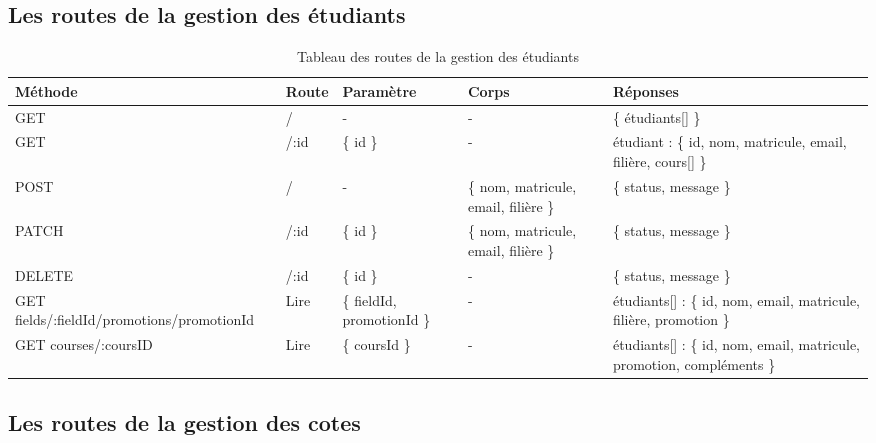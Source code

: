 \subsection{Les routes de la gestion des étudiants}\label{subsec:routes-student}

\begin{table}[ht]
  \caption{Tableau des routes de la gestion des étudiants}
  \label{tab:routes-student}
  \begin{tabular}{|p{1.5cm}|p{1cm}|p{2cm}|p{3cm}|p{3cm}| }
    \hline
    Méthode & Route & Paramètre & Corps & Réponses \\
    \hline
    GET & / & - & - & \{ étudiants[] \} \\
    \hline
    GET & /:id & \{ id \} & - & étudiant : \{ id, nom, matricule, email, filière, cours[] \} \\
    \hline
    POST & / & - & \{ nom, matricule, email, filière \} & \{ status, message \} \\
    \hline
    PATCH & /:id & \{ id \} & \{ nom, matricule, email, filière \} & \{ status, message \} \\
    \hline
    DELETE & /:id & \{ id \} & - & \{ status, message \} \\
    \hline
    GET fields/:fieldId/promotions/promotionId & Lire & \{ fieldId, promotionId \} & - &  étudiants[] : \{ id, nom, email, matricule, filière, promotion \} \\
    \hline
    GET courses/:coursID & Lire & \{ coursId \} & - &  étudiants[] : \{ id, nom, email, matricule, promotion, compléments \} \\
    \hline
  \end{tabular}
\end{table}
\pagebreak

\subsection{Les routes de la gestion des cotes}\label{subsec:routes-grade}


